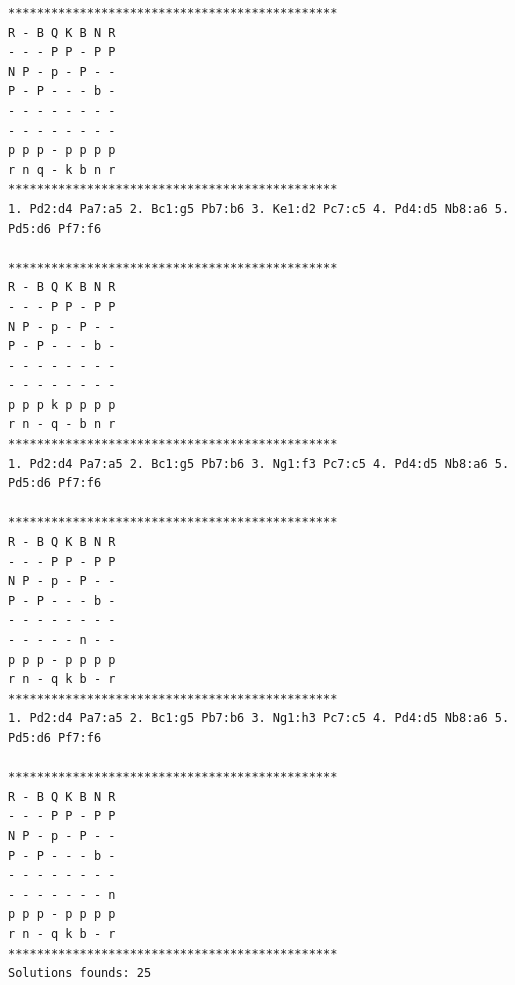 \documentclass[11pt]{article}
\begin{document}
\begin{verbatim}
**********************************************
R - B Q K B N R 
- - - P P - P P 
N P - p - P - - 
P - P - - - b - 
- - - - - - - - 
- - - - - - - - 
p p p - p p p p 
r n q - k b n r 
**********************************************
1. Pd2:d4 Pa7:a5 2. Bc1:g5 Pb7:b6 3. Ke1:d2 Pc7:c5 4. Pd4:d5 Nb8:a6 5. Pd5:d6 Pf7:f6 

**********************************************
R - B Q K B N R 
- - - P P - P P 
N P - p - P - - 
P - P - - - b - 
- - - - - - - - 
- - - - - - - - 
p p p k p p p p 
r n - q - b n r 
**********************************************
1. Pd2:d4 Pa7:a5 2. Bc1:g5 Pb7:b6 3. Ng1:f3 Pc7:c5 4. Pd4:d5 Nb8:a6 5. Pd5:d6 Pf7:f6 

**********************************************
R - B Q K B N R 
- - - P P - P P 
N P - p - P - - 
P - P - - - b - 
- - - - - - - - 
- - - - - n - - 
p p p - p p p p 
r n - q k b - r 
**********************************************
1. Pd2:d4 Pa7:a5 2. Bc1:g5 Pb7:b6 3. Ng1:h3 Pc7:c5 4. Pd4:d5 Nb8:a6 5. Pd5:d6 Pf7:f6 

**********************************************
R - B Q K B N R 
- - - P P - P P 
N P - p - P - - 
P - P - - - b - 
- - - - - - - - 
- - - - - - - n 
p p p - p p p p 
r n - q k b - r 
**********************************************
Solutions founds: 25
\end{verbatim}
\end{document}
